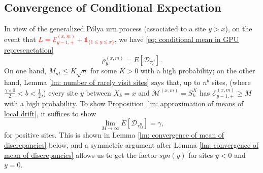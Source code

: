 \documentclass[twoside,12pt,a4paper]{article}
\numberwithin{equation}{section}
\newcommand{\edt}[1]{\textcolor{red}{#1}} %
\newcommand{\comment}[1]{\textcolor{blue}{#1}}
\begin{document}
		\subsection{Convergence of Conditional Expectation}
		\label{sec:RhoGamma}
		In view of the generalized P\'{o}lya urn process (associated to a site $y> x$), 
		on the event that \edt{$ L = \mathcal{E}^{(x,m)}_{y-1,+} +\mathbb{1}_{\{1\leq y\leq x\}}$}, we have \eqref{eq: conditional mean in GPU represenetation} 
		$$\rho^{(x,m)}_y = E[\mathcal{D}_{\tau_L^B}].$$ 
		On one hand, $M_{nt} \leq K\sqrt{n} $ for some $K>0$ with a high probability; on the other hand, Lemma \ref{lm: number of rarely visit sites} says that, up to $n^b$ sites, (where $\frac{\gamma \vee 0}{2}<b<\frac{1}{2}$,) every site $y$ between $X_k=x$ and $\mathcal{M}^{(x,m)} =S_{k}^X$ has $ \mathcal{E}^{(x,m)}_{y-1,+} \geq M  $ with a high probability. To show Proposition \ref{lm: approximation of means of local drift}, it suffices to show 
		\begin{equation}\label{eq: convergence of conditional expectation}
			\lim_{M\to\infty} E[\mathcal{D}_{\tau_M^B}] = \gamma , 
		\end{equation} for positive sites. This is shown in Lemma \ref{lm: convergence of mean of discrepancies} below, and a symmetric argument after Lemma \ref{lm: convergence of mean of discrepancies} allows us to get the factor $sgn(y)$ for sites $y<0$ and $y=0$.
		
\end{document}
